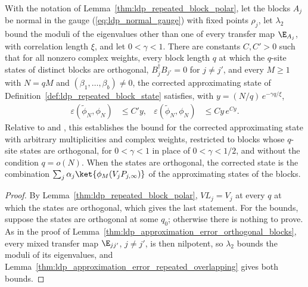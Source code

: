\begin{lemma}
    \label{thm:ldp_approximation_error_repeated_orthogonal_blocks}
    \leanok
    With the notation of Lemma~\ref{thm:ldp_repeated_block_polar}, let the
    blocks $A_j$ be normal in the gauge (\ref{eq:ldp_normal_gauge}) with fixed
    points $\rho_j$, let $\lambda_2$ bound the moduli of the eigenvalues other
    than one of every transfer map $\E_{A_j}$, with correlation length $\xi$, and
    let $0<\gamma<1$. There are constants $C,C'>0$ such that for all nonzero
    complex weights, every block length $q$ at which the $q$-site states of
    distinct blocks are orthogonal, $B_j^\dagger B_{j'}=0$ for $j\neq j'$, and
    every $M\geq1$ with $N=qM$ and $(\beta_1,\dots,\beta_b)\neq0$, the corrected
    approximating state of Definition~\ref{def:ldp_repeated_block_state}
    satisfies, with $y=(N/q)\,e^{-\gamma q/\xi}$,
    \begin{align*}
        \varepsilon(\widetilde\phi_N,\phi_N) & \leq C'y,        &
        \varepsilon(\widetilde\phi_N,\phi_N) & \leq Cy\,e^{Cy}.
    \end{align*}
    Relative to \cite[Lemma~1$'$(ii)]{Malz2024Preparation} and
    \cite{gap:mswc24_repeated_block_corrected_state,gap:mswc24_block_form_mixed_overlap},
    this establishes the bound for the corrected approximating state with
    arbitrary multiplicities and complex weights, restricted to blocks whose
    $q$-site states are orthogonal, for $0<\gamma<1$ in place of
    $0<\gamma<1/2$, and without the condition $q=o(N)$.
    When the states are orthogonal, the corrected state is the combination
    $\sum_j\alpha_j\ket{\phi_M(V_jP_{j,\infty})}$ of the approximating states of the
    blocks.
\end{lemma}
\begin{proof}
    \leanok
    By Lemma~\ref{thm:ldp_repeated_block_polar}, $VL_j=V_j$ at every $q$ at which
    the states are orthogonal, which gives the last statement. For the bounds,
    suppose the states are orthogonal at some $q_0$; otherwise there is nothing to
    prove. As in the proof of
    Lemma~\ref{thm:ldp_approximation_error_orthogonal_blocks}, every mixed
    transfer map $\E_{jj'}$, $j\neq j'$, is then nilpotent, so $\lambda_2$ bounds the
    moduli of its eigenvalues, and
    Lemma~\ref{thm:ldp_approximation_error_repeated_overlapping} gives both bounds.
\end{proof}
